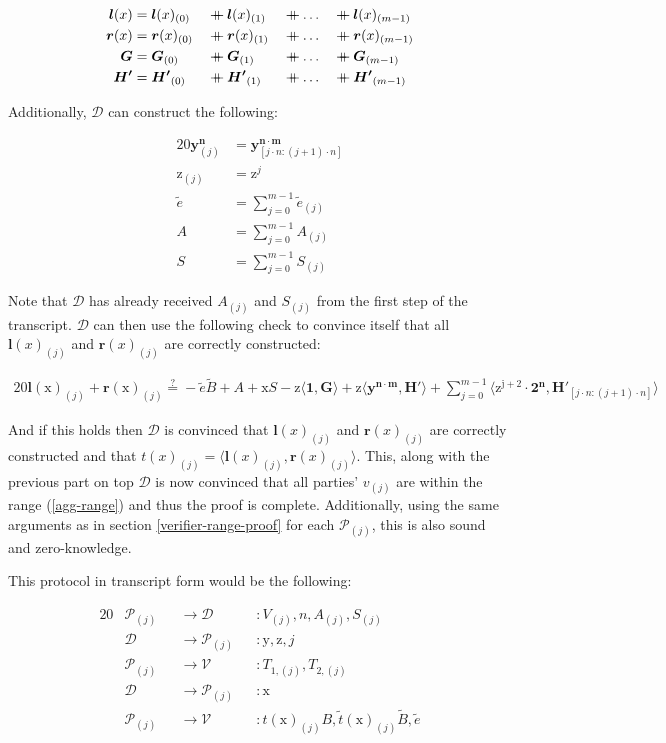 \documentclass{article}
\newcommand{\eq}[1]{\begin{alignat*}{20}#1\end{alignat*}}
\renewcommand{\vec}[1]{\boldsymbol{#1}}
\newcommand{\ran}[1]{\mathrm{#1}}
\newcommand{\vecran}[1]{\mathbf{#1}}
\newcommand{\V}{\mathcal{V}}
\renewcommand{\P}{\mathcal{P}}
\newcommand{\D}{\mathcal{D}}
\newcommand\concat{\mathbin{+\mkern-10mu+}} %
\newcommand{\dotp}[2]{\langle #1, #2 \rangle}
\newcommand{\blind}[1]{\widetilde{#1}}
\newcommand{\bt}{\blind{t}}
\newcommand{\bB}{\blind{B}}
\newcommand{\be}{\blind{e}}
\begin{document}
\eq{
	\vec{l}(x) &= \vec{l}(x)_{(0)} &&\concat \vec{l}(x)_{(1)} &&\concat \dots &&\concat \vec{l}(x)_{(m-1)}\\
	\vec{r}(x) &= \vec{r}(x)_{(0)} &&\concat \vec{r}(x)_{(1)} &&\concat \dots &&\concat \vec{r}(x)_{(m-1)}\\
	\vec{G}    &= \vec{G}_{(0)}    &&\concat \vec{G}_{(1)}    &&\concat \dots &&\concat \vec{G}_{(m-1)}\\
	\vec{H'}   &= \vec{H'}_{(0)}   &&\concat \vec{H'}_{(1)}   &&\concat \dots &&\concat \vec{H'}_{(m-1)}
}

Additionally, $\D$ can construct the following:

\eq{
	\vecran{y}^{\vec{n}}_{(j)} &= \vecran{y}^{\vec{n \cdot m}}_{[j \cdot n : (j+1) \cdot n]}\\
	\ran{z}_{(j)}      &= \ran{z}^j\\
	\be      &= \sum^{m-1}_{j = 0} \be_{(j)}\\
	A                  &= \sum^{m-1}_{j = 0} A_{(j)}\\
	S                  &= \sum^{m-1}_{j = 0} S_{(j)}
}

Note that $\D$ has already received $A_{(j)}$ and $S_{(j)}$ from the
first step of the transcript. $\D$ can then use the following check
to convince itself that all $\vec{l}(x)_{(j)}$ and $\vec{r}(x)_{(j)}$
are correctly constructed:

\eq{
	\vec{l}(\ran{x})_{(j)} + \vec{r}(\ran{x})_{(j)} \stackrel{?}{=}
	-\be\bB + A + \ran{x}S - \ran{z}\dotp{\vec{1}}{\vec{G}} +
	\ran{z}\dotp{\vecran{y}^{\vec{n \cdot m}}}{\vec{H'}} +
	\sum^{m-1}_{j = 0}\dotp{\ran{z^{j+2}} \cdot \vec{2^n}}{\vec{H'}_{[j \cdot n: (j+1) \cdot n]}}
}

And if this holds then $\D$ is convinced that $\vec{l}(x)_{(j)}$ and
$\vec{r}(x)_{(j)}$ are correctly constructed and that $t(x)_{(j)}
= \dotp{\vec{l}(x)_{(j)}}{\vec{r}(x)_{(j)}}$. This, along with
the previous part on top $\D$ is now convinced that all parties'
$v_{(j)}$ are within the range (\ref{agg-range}) and thus the proof
is complete. Additionally, using the same arguments as in section
\ref{verifier-range-proof} for each $\P_{(j)}$, this is also sound
and zero-knowledge.

This protocol in transcript form would be the following: 

\eq{
	&\P_{(j)} &&\rightarrow \D &&: V_{(j)}, n, A_{(j)}, S_{(j)} \\
	&\D &&\rightarrow \P_{(j)} &&: \ran{y}, \ran{z}, j \\
	&\P_{(j)} &&\rightarrow \V &&: T_{1, (j)}, T_{2,(j)} \\
	&\D &&\rightarrow \P_{(j)} &&: \ran{x} \\
	&\P_{(j)} &&\rightarrow \V &&: t(\ran{x})_{(j)} B, \bt(\ran{x})_{(j)}\bB, \be
}
\end{document}
